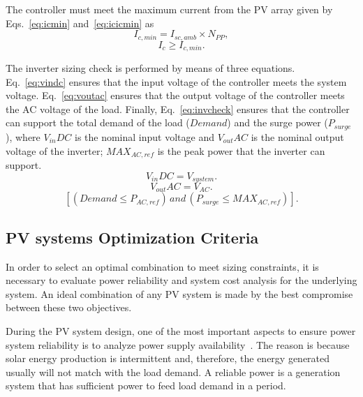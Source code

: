\documentclass[review]{elsarticle}
\begin{document}
The controller must meet the maximum current from the PV array given by Eqs.~\eqref{eq:icmin} and~\eqref{eq:icicmin} as
%
\begin{equation}
\label{eq:icmin}
I_{c,min} = I_{sc,amb} \times N_{PP},
\end{equation}
%
\begin{equation}
\label{eq:icicmin}
I_{c} \geq I_{c,min}.
\end{equation}

The inverter sizing check is performed by means of three equations. Eq.~\eqref{eq:vindc} ensures that 
the input voltage of the controller meets the system voltage. Eq.~\eqref{eq:voutac} ensures that the 
output voltage of the controller meets the AC voltage of the load. Finally, Eq.~\eqref{eq:invcheck} ensures that 
the controller can support the total demand of the load ($Demand$) and the surge power ($P_{surge}$), 
where $V_{in}DC$ is the nominal input voltage and $V_{out}AC$ is the nominal output voltage of the inverter; 
$MAX_{AC,ref}$ is the peak power that the inverter can support.
%
\begin{equation}
\label{eq:vindc} 
V_{in}DC = V_{system}.
\end{equation}
%
\begin{equation}
\label{eq:voutac} 
V_{out}AC = V_{AC}.
\end{equation}
%
\begin{equation}
\label{eq:invcheck} 
\left[ (Demand \leq P_{AC,ref}) \, and \, (P_{surge} \leq MAX_{AC,ref}) \right].
\end{equation}

\subsection{PV systems Optimization Criteria}

In order to select an optimal combination to meet sizing constraints, 
it is necessary to evaluate power reliability and system cost analysis for the underlying system. An ideal combination of any PV system is made by the best compromise between these two objectives.

During the PV system design, one of the most important aspects to ensure power system reliability is to analyze power supply availability~\cite{Alsadi2018}. The reason is because solar energy production is intermittent and, therefore, the energy generated usually will not match with the load demand. A reliable power is a generation system that has sufficient power to feed load demand in a period. 
\end{document}
